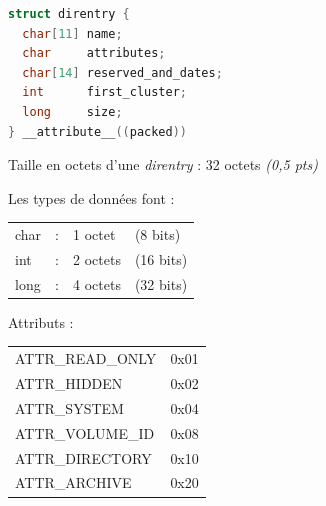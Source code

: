 \documentclass[11pt,a4paper]{article}
\begin{document}
\begin{table}[ht!]
  \centering
  \begin{minipage}{0.51\textwidth}
    \centering


\begin{lstlisting}[language=C]
struct direntry {
  char[11] name;
  char     attributes;
  char[14] reserved_and_dates;
  int      first_cluster;
  long     size;
} __attribute__((packed)) \end{lstlisting}

Taille en octets d'une \textit{direntry} : 32 octets \textit{(0,5 pts)}

  \end{minipage}
  \hfillx
  \begin{minipage}{0.39\textwidth}

Les types de données font :

\smallskip

\begin{tabular}{l l l l}
char & : & 1 octet  & (8 bits)  \\
int  & : & 2 octets & (16 bits) \\
long & : & 4 octets & (32 bits) \\
\end{tabular}


\medskip

Attributs :

\medskip

\begin{tabular}{l l}
ATTR\_READ\_ONLY & 0x01 \\
ATTR\_HIDDEN     & 0x02 \\
ATTR\_SYSTEM     & 0x04 \\
ATTR\_VOLUME\_ID & 0x08 \\
ATTR\_DIRECTORY  & 0x10 \\
ATTR\_ARCHIVE    & 0x20 \\
\end{tabular}

  \end{minipage}
\end{table}
\end{document}
